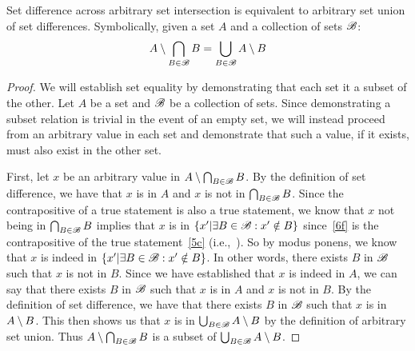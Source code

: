 \documentclass[main.tex]{subfiles}
\begin{document}
\subproblem{}\label{9b}

\begin{thm}
	Set difference across arbitrary set intersection is equivalent to
	arbitrary set union of set differences. Symbolically, given a set \(A\)
	and a collection of sets \(\mathscr{B}\):
	\[A \setminus \bigcap\limits_{B \in \mathscr{B}} {B} = \bigcup\limits_{B \in \mathscr{B}} {A \setminus B}\]
\end{thm}
\begin{proof}
	We will establish set equality by demonstrating that each set it a
	subset of the other. Let \(A\) be a set and \(\mathscr{B}\) be a
	collection of sets. Since demonstrating a subset relation is trivial
	in the event of an empty set, we will instead proceed from an arbitrary
	value in each set and demonstrate that such a value, if it exists, must
	also exist in the other set.

	\medskip{}
	First, let \(x\) be an arbitrary value in
	\(A \setminus \bigcap_{B \in \mathscr{B}} {B}\). By the
	definition of set difference, we have that \(x\) is in \(A\) and \(x\)
	is not in \(\bigcap_{B \in \mathscr{B}} {B}\). Since the
	contrapositive of a true statement is also a true statement, we know
	that \(x\) not being in \(\bigcap_{B \in \mathscr{B}} {B}\)
	implies that \(x\) is in
	\(\{x'|\exists B \in \mathscr{B} : x' \notin B\}\)
	since~\ref{6f} is the contrapositive of the true statement~\ref{5c}
	(i.e.,~). So by modus ponens, we know that \(x\) is indeed
	in
	\(\{x'|\exists B \in \mathscr{B} : x' \notin B\}\).
	In other words, there exists \(B\) in \(\mathscr{B}\) such that \(x\) is
	not in \(B\). Since we have established that \(x\) is indeed in \(A\),
	we can say that there exists \(B\) in \(\mathscr{B}\) such that \(x\) is
	in \(A\) and \(x\) is not in \(B\). By the definition of set difference,
	we have that there exists \(B\) in \(\mathscr{B}\) such that \(x\) is in
	\(A \setminus B\). This then shows us that \(x\) is in
	\(\bigcup_{B \in \mathscr{B}} {A \setminus B}\) by the definition
	of arbitrary set union. Thus
	\(A \setminus \bigcap_{B \in \mathscr{B}} {B}\) is a subset
	of \(\bigcup_{B \in \mathscr{B}} {A \setminus B}\).


\end{proof}
\end{document}

